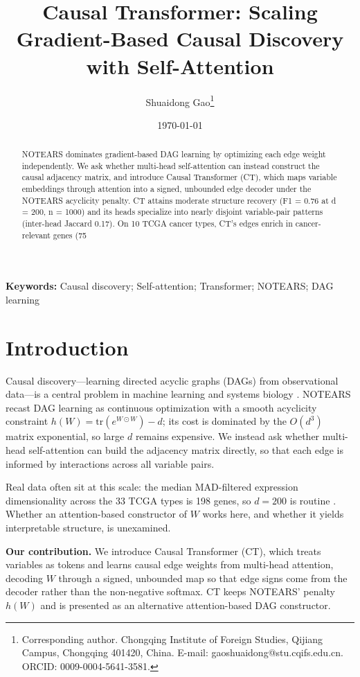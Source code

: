 \documentclass[12pt,a4paper]{article}
\title{Causal Transformer: Scaling Gradient-Based Causal Discovery with Self-Attention}
\author{Shuaidong Gao\thanks{Corresponding author. Chongqing Institute of Foreign Studies, Qijiang Campus, Chongqing 401420, China. E-mail: gaoshuaidong@stu.cqifs.edu.cn. ORCID: 0009-0004-5641-3581.}}
\date{\today}
\begin{document}
\maketitle

\begin{abstract}
NOTEARS dominates gradient-based DAG learning by optimizing each edge weight independently. We ask whether multi-head self-attention can instead construct the causal adjacency matrix, and introduce Causal Transformer (CT), which maps variable embeddings through attention into a signed, unbounded edge decoder under the NOTEARS acyclicity penalty. CT attains moderate structure recovery (F1 = 0.76 at d = 200, n = 1000) and its heads specialize into nearly disjoint variable-pair patterns (inter-head Jaccard 0.17). On 10 TCGA cancer types, CT's edges enrich in cancer-relevant genes (75%
\end{abstract}

\noindent\textbf{Keywords:} Causal discovery; Self-attention; Transformer; NOTEARS; DAG learning

\vspace{0.5em}

\section{Introduction}

Causal discovery---learning directed acyclic graphs (DAGs) from observational data---is a central problem in machine learning and systems biology \cite{zheng2018dags,sachs2005causal,peters2017elements}. NOTEARS \cite{zheng2018dags} recast DAG learning as continuous optimization with a smooth acyclicity constraint $h(W) = \mathrm{tr}(e^{W \odot W}) - d$; its cost is dominated by the $O(d^3)$ matrix exponential, so large $d$ remains expensive. We instead ask whether multi-head self-attention can build the adjacency matrix directly, so that each edge is informed by interactions across all variable pairs.

Real data often sit at this scale: the median MAD-filtered expression dimensionality across the 33 TCGA types is 198 genes, so $d=200$ is routine \cite{sporns2005human,heckerman1997bayesian}. Whether an attention-based constructor of $W$ works here, and whether it yields interpretable structure, is unexamined.

\textbf{Our contribution.} We introduce Causal Transformer (CT), which treats variables as tokens and learns causal edge weights from multi-head attention, decoding $W$ through a signed, unbounded map so that edge signs come from the decoder rather than the non-negative softmax. CT keeps NOTEARS' penalty $h(W)$ and is presented as an alternative attention-based DAG constructor.
\end{document}
